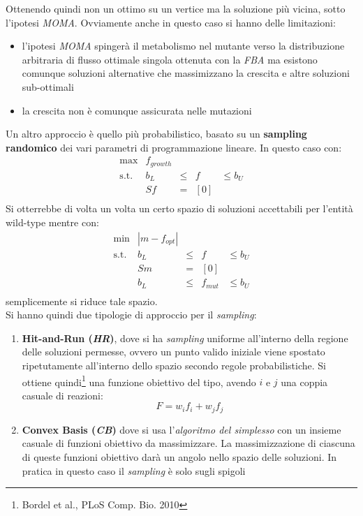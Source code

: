 \documentclass[a4paper,12pt, oneside]{book}
\begin{document}
Ottenendo quindi non un ottimo su un vertice ma la soluzione più vicina, sotto
l'ipotesi \textit{MOMA}. Ovviamente anche in questo caso si hanno delle
limitazioni: 
\begin{itemize}
  \item l'ipotesi \textit{MOMA} spingerà il metabolismo nel mutante verso la
  distribuzione arbitraria di flusso ottimale singola ottenuta con la
  \textit{FBA} ma esistono comunque soluzioni alternative che massimizzano la
  crescita e altre soluzioni sub-ottimali    
  \item la crescita non è comunque assicurata nelle mutazioni
\end{itemize}
Un altro approccio è quello più probabilistico, basato su un \textbf{sampling
  randomico} dei vari parametri di programmazione lineare. In questo caso con:
\begin{equation*}
  \begin{array}{rrclcl}
    \displaystyle \max & f_{growth} \\
    \textrm{s.t.} & b_L & \leq & f & \leq b_{U} \\
                       & Sf & = & [0] \\
  \end{array}
\end{equation*}
Si otterrebbe di volta un volta un certo spazio di soluzioni accettabili per
l'entità wild-type mentre con:
\begin{equation*}
  \begin{array}{rrclcl}
    \displaystyle \min & |m-f_{opt}| \\
    \textrm{s.t.} & b_L & \leq & f & \leq b_{U} \\
                       & Sm & = & [0] \\
                       & b_L & \leq & f_{mut} & \leq b_{U} \\
  \end{array}
\end{equation*}
semplicemente si riduce tale spazio.\\
Si hanno quindi due tipologie di approccio per il \textit{sampling}:
\begin{enumerate}
  \item \textbf{Hit-and-Run (\textit{HR})}, dove si ha \textit{sampling}
  uniforme all'interno della regione delle soluzioni permesse, ovvero un punto
  valido iniziale viene spostato ripetutamente all'interno dello spazio secondo
  regole probabilistiche. Si ottiene quindi\footnote{Bordel et al., PLoS
    Comp. Bio. 2010} una funzione obiettivo del tipo, avendo $i$ e $j$ una
  coppia casuale di reazioni:
  \[F=w_if_i+w_jf_j\]
  \item \textbf{Convex Basis (\textit{CB})} dove si usa l'\textit{algoritmo del
    simplesso} con un insieme casuale di funzioni obiettivo da massimizzare. La
  massimizzazione di ciascuna di queste funzioni obiettivo darà un angolo nello
  spazio delle soluzioni. In pratica in questo caso il \textit{sampling} è solo
  sugli spigoli
\end{enumerate}
\end{document}
